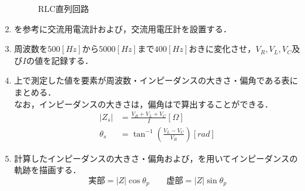 \documentclass[11pt,dvipdfmx]{jarticle}
\begin{document}
\begin{enumerate}
\begin{figure}
 \caption{RLC直列回路}
 \label{fig:fig3}
\end{figure}
\item {}を参考に交流用電流計および，交流用電圧計を設置する．
\item 周波数を$500[Hz]$から$5000[Hz]$まで$400[Hz]$おきに変化させ，$V_R,V_L,V_C$及び$I$の値を記録する．
\item 上で測定した値を要素が周波数・インピーダンスの大きさ・偏角である表にまとめる．\\
なお，インピーダンスの大きさは，偏角はで算出することができる．
\begin{align}
\label{eq:1}
|Z_s|&=\frac{V_R+V_L+V_C}{I}[\Omega]\\
\label{eq:2}
\theta_s&=\tan^{-1}\left(\frac{V_L-V_C}{V_R}\right)[rad]
\end{align}
\item 計算したインピーダンスの大きさ・偏角および，を用いてインピーダンスの軌跡を描画する．
\begin{equation}
\label{eq:8}
実部=|Z|\cos \theta_p \qquad 虚部=|Z|\sin \theta_p 
\end{equation}
\end{enumerate}
\end{document}
